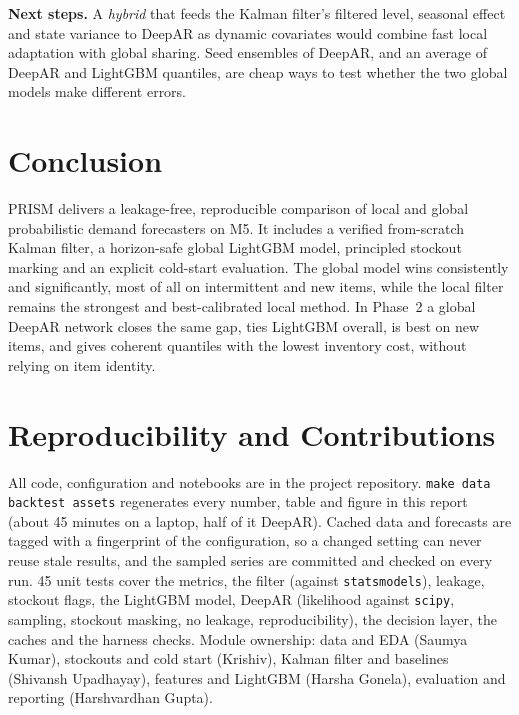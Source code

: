 \documentclass[conference]{IEEEtran}
\begin{document}
\textbf{Next steps.} A \emph{hybrid} that feeds the Kalman filter's filtered level, seasonal effect and state variance to DeepAR as dynamic covariates would combine fast local adaptation with global sharing. Seed ensembles of DeepAR, and an average of DeepAR and LightGBM quantiles, are cheap ways to test whether the two global models make different errors.

\section{Conclusion}
PRISM delivers a leakage-free, reproducible comparison of local and global probabilistic demand forecasters on M5. It includes a verified from-scratch Kalman filter, a horizon-safe global LightGBM model, principled stockout marking and an explicit cold-start evaluation. The global model wins consistently and significantly, most of all on intermittent and new items, while the local filter remains the strongest and best-calibrated local method. In Phase~2 a global DeepAR network closes the same gap, ties LightGBM overall, is best on new items, and gives coherent quantiles with the lowest inventory cost, without relying on item identity.

\section*{Reproducibility and Contributions}
All code, configuration and notebooks are in the project repository. \texttt{make data backtest assets} regenerates every number, table and figure in this report (about 45 minutes on a laptop, half of it DeepAR). Cached data and forecasts are tagged with a fingerprint of the configuration, so a changed setting can never reuse stale results, and the sampled series are committed and checked on every run. 45 unit tests cover the metrics, the filter (against \texttt{statsmodels}), leakage, stockout flags, the LightGBM model, DeepAR (likelihood against \texttt{scipy}, sampling, stockout masking, no leakage, reproducibility), the decision layer, the caches and the harness checks. Module ownership: data and EDA (Saumya Kumar), stockouts and cold start (Krishiv), Kalman filter and baselines (Shivansh Upadhayay), features and LightGBM (Harsha Gonela), evaluation and reporting (Harshvardhan Gupta).
\end{document}
